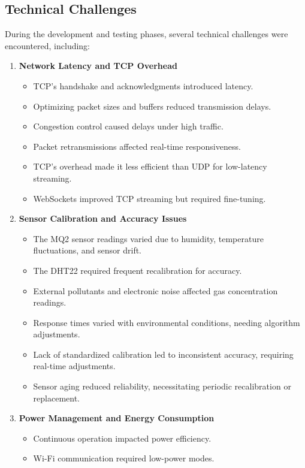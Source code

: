 \documentclass[a4paper]{scrartcl}
\begin{document}
\subsection{Technical Challenges}
During the development and testing phases, several technical challenges were encountered, including:
\begin{enumerate}
    \item \textbf{Network Latency and TCP Overhead}
        \begin{itemize}
            \item TCP's handshake and acknowledgments introduced latency.
            \item Optimizing packet sizes and buffers reduced transmission delays.
            \item Congestion control caused delays under high traffic.
            \item Packet retransmissions affected real-time responsiveness.
            \item TCP's overhead made it less efficient than UDP for low-latency streaming.
            \item WebSockets improved TCP streaming but required fine-tuning.
        \end{itemize}
    \item \textbf{Sensor Calibration and Accuracy Issues}
       \begin{itemize}
    \item The MQ2 sensor readings varied due to humidity, temperature fluctuations, and sensor drift.  
    \item The DHT22 required frequent recalibration for accuracy.  
    \item External pollutants and electronic noise affected gas concentration readings.  
    \item Response times varied with environmental conditions, needing algorithm adjustments.  
    \item Lack of standardized calibration led to inconsistent accuracy, requiring real-time adjustments.  
    \item Sensor aging reduced reliability, necessitating periodic recalibration or replacement.  
\end{itemize}
    \item \textbf{Power Management and Energy Consumption}
    \begin{itemize}
    \item Continuous operation impacted power efficiency.  
    \item Wi-Fi communication required low-power modes.  

\end{itemize}
\end{enumerate}
\end{document}
